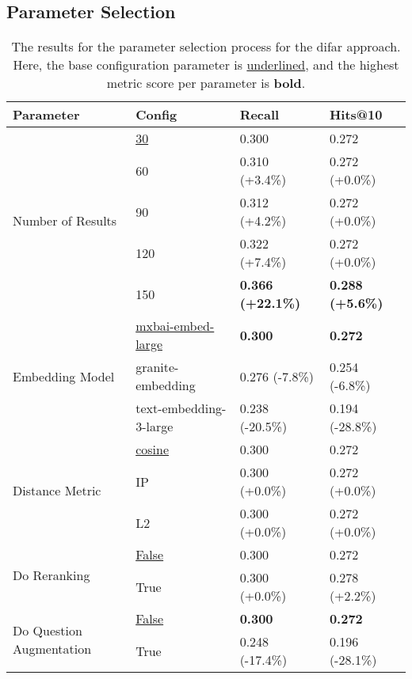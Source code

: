 \subsection{Parameter Selection}

\begin{table}[t]
    \centering
    \begin{tabular}{llll}
        \toprule
        \textbf{Parameter} & \textbf{Config} & \textbf{Recall} & \textbf{Hits@10} \\
        \midrule
        \multirow{5}{*}{Number of Results}
            & \underline{30} & 0.300 & 0.272 \\
            & 60  & 0.310 (+3.4\%)  & 0.272 (+0.0\%) \\
            & 90  & 0.312 (+4.2\%)  & 0.272 (+0.0\%) \\
            & 120 & 0.322 (+7.4\%) & 0.272 (+0.0\%) \\
            & 150 & \textbf{0.366 (+22.1\%)} & \textbf{0.288 (+5.6\%)} \\
        \midrule
        \multirow{3}{*}{Embedding Model}
            & \underline{mxbai-embed-large} & \textbf{0.300} & \textbf{0.272} \\
            & granite-embedding & 0.276 (-7.8\%) & 0.254 (-6.8\%) \\
            & text-embedding-3-large & 0.238 (-20.5\%) & 0.194 (-28.8\%) \\
        \midrule
        \multirow{3}{*}{Distance Metric}
            & \underline{cosine} & 0.300 & 0.272 \\
            & IP & 0.300 (+0.0\%) & 0.272 (+0.0\%) \\
            & L2 & 0.300 (+0.0\%) & 0.272 (+0.0\%) \\
        \midrule
        \multirow{2}{*}{Do Reranking}
            & \underline{False} & 0.300 & 0.272 \\
            & True & 0.300 (+0.0\%) & 0.278 (+2.2\%) \\
        \midrule
        \multirow{2}{*}{Do Question Augmentation}
            & \underline{False} & \textbf{0.300} & \textbf{0.272} \\
            & True & 0.248 (-17.4\%) & 0.196 (-28.1\%) \\
        \bottomrule
    \end{tabular}
    \caption[Results of the Parameter Selection Process for DiFaR]{The results for the parameter selection process for the \gls{difar} approach. Here, the base configuration parameter is \underline{underlined}, and the highest metric score per parameter is \textbf{bold}.}
    \label{tab:difar_parameter_selection}
\end{table}

